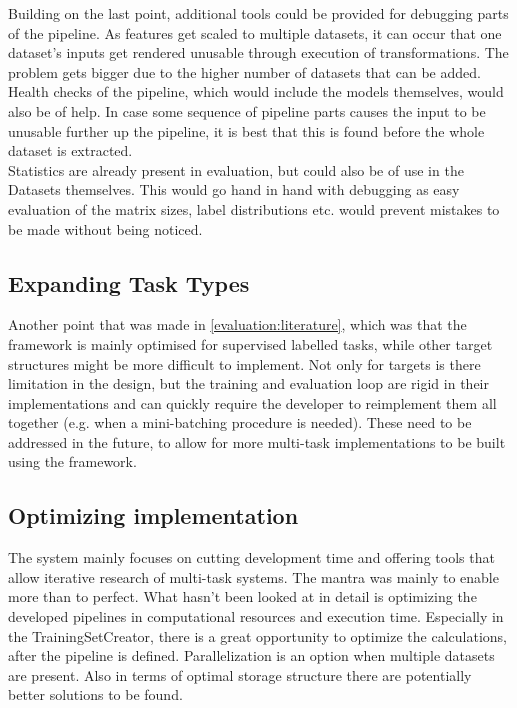 Building on the last point, additional tools could be provided for debugging parts of the pipeline. As features get scaled to multiple datasets, it can occur that one dataset's inputs get rendered unusable through execution of transformations. The problem gets bigger due to the higher number of datasets that can be added. Health checks of the pipeline, which would include the models themselves, would also be of help. In case some sequence of pipeline parts causes the input to be unusable further up the pipeline, it is best that this is found before the whole dataset is extracted.\\

Statistics are already present in evaluation, but could also be of use in the Datasets themselves. This would go hand in hand with debugging as easy evaluation of the matrix sizes, label distributions etc. would prevent mistakes to be made without being noticed.

\subsection{Expanding Task Types}

Another point that was made in \ref{evaluation:literature}, which was that the framework is mainly optimised for supervised labelled tasks, while other target structures might be more difficult to implement. Not only for targets is there limitation in the design, but the training and evaluation loop are rigid in their implementations and can quickly require the developer to reimplement them all together (e.g. when a mini-batching procedure is needed). These need to be addressed in the future, to allow for more multi-task implementations to be built using the framework. 

\subsection{Optimizing implementation}

The system mainly focuses on cutting development time and offering tools that allow iterative research of multi-task systems. The mantra was mainly to enable more than to perfect. What hasn't been looked at in detail is optimizing the developed pipelines in computational resources and execution time. Especially in the TrainingSetCreator, there is a great opportunity to optimize the calculations, after the pipeline is defined. Parallelization is an option when multiple datasets are present. Also in terms of optimal storage structure there are potentially better solutions to be found.

